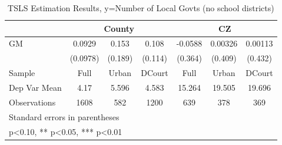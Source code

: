 \begin{table}[htbp]\centering
\def\sym#1{\ifmmode^{#1}\else\(^{#1}\)\fi}
\caption{TSLS Estimation Results, y=Number of Local Govts (no school districts)}
\begin{tabular}{l*{6}{c}}
\toprule
                &\multicolumn{3}{c}{County}            &\multicolumn{3}{c}{CZ}                \\\cmidrule(lr){2-4}\cmidrule(lr){5-7}
\midrule
GM              &   0.0929   &    0.153   &    0.108   &  -0.0588   &  0.00326   &  0.00113   \\
                & (0.0978)   &  (0.189)   &  (0.114)   &  (0.364)   &  (0.409)   &  (0.432)   \\
\midrule
Sample          &     Full   &    Urban   &   DCourt   &     Full   &    Urban   &   DCourt   \\
Dep Var Mean    &     4.17   &    5.596   &    4.583   &   15.264   &   19.505   &   19.696   \\
Observations    &     1608   &      582   &     1200   &      639   &      378   &      369   \\
\bottomrule
\multicolumn{7}{l}{\footnotesize Standard errors in parentheses}\\
\multicolumn{7}{l}{\footnotesize * p<0.10, ** p<0.05, *** p<0.01}\\
\end{tabular}
\end{table}
